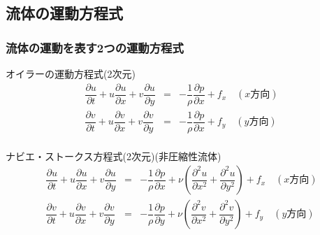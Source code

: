 \documentclass[a4paper]{jsarticle}
\begin{document}
\subsection{流体の運動方程式}
\subsubsection{流体の運動を表す2つの運動方程式}
\begin{itembox}[l]{オイラーの運動方程式(2次元)}
    \begin{eqnarray*}
        \dfrac{\partial u}{\partial t}+u\dfrac{\partial u}{\partial x}+v\dfrac{\partial u}{\partial y}&=&-\dfrac{1}{\rho}\dfrac{\partial p}{\partial x}+f_x\quad(x方向)\\
        \dfrac{\partial v}{\partial t}+u\dfrac{\partial v}{\partial x}+v\dfrac{\partial v}{\partial y}&=&-\dfrac{1}{\rho}\dfrac{\partial p}{\partial x}+f_y\quad(y方向)\\
    \end{eqnarray*}
\end{itembox}
\begin{itembox}[l]{ナビエ・ストークス方程式(2次元)\quad(非圧縮性流体)}
    \begin{eqnarray*}
        \dfrac{\partial u}{\partial t}+u\dfrac{\partial u}{\partial x}+v\dfrac{\partial u}{\partial y}&=&-\dfrac{1}{\rho}\dfrac{\partial p}{\partial x}+\nu\left(\dfrac{\partial^2 u}{\partial x^2}+\dfrac{\partial^2 u}{\partial y^2}\right)+f_x\quad(x方向)\\
        \dfrac{\partial v}{\partial t}+u\dfrac{\partial v}{\partial x}+v\dfrac{\partial v}{\partial y}&=&-\dfrac{1}{\rho}\dfrac{\partial p}{\partial y}+\nu\left(\dfrac{\partial^2 v}{\partial x^2}+\dfrac{\partial^2 v}{\partial y^2}\right)+f_y\quad(y方向)\\
    \end{eqnarray*}
\end{itembox}
\end{document}
